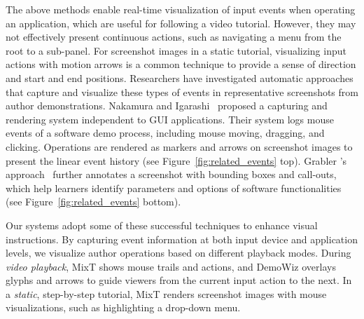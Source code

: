 The above methods enable real-time visualization of input events when operating an application, which are useful for following a video tutorial. However, they may not effectively present continuous actions, such as navigating a menu from the root to a sub-panel. For screenshot images in a static tutorial, visualizing input actions with motion arrows is a common technique to provide a sense of direction and start and end positions.
%
Researchers have investigated automatic approaches that capture and visualize these types of events in representative screenshots from author demonstrations. Nakamura and Igarashi~\cite{Nakamura:2008:ASV:1449715.1449721} proposed a capturing and rendering system independent to GUI applications. Their system logs mouse events of a software demo process, including mouse moving, dragging, and clicking. Operations are rendered as markers and arrows on screenshot images to present the linear event history (see Figure~\ref{fig:related_events} top).
%
Grabler \ea{}'s approach~\cite{Grabler:2009jj} further annotates a screenshot with bounding boxes and call-outs, which help learners identify parameters and options of software functionalities (see Figure~\ref{fig:related_events} bottom).

Our systems adopt some of these successful techniques to enhance visual instructions. By capturing event information at both input device and application levels, we visualize author operations based on different playback modes.
%
During \emph{video playback}, MixT shows mouse trails and actions, and DemoWiz overlays glyphs and arrows to guide viewers from the current input action to the next.
%
In a \emph{static}, step-by-step tutorial, MixT renders screenshot images with mouse visualizations, such as highlighting a drop-down menu.


